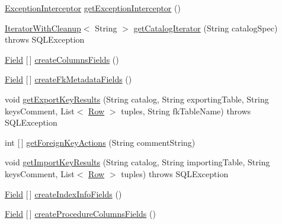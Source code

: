 \begin{DoxyCompactItemize}
\item 
\mbox{\hyperlink{interfacecom_1_1mysql_1_1cj_1_1exceptions_1_1_exception_interceptor}{Exception\+Interceptor}} \mbox{\hyperlink{classcom_1_1mysql_1_1cj_1_1jdbc_1_1_database_meta_data_a099b29ac36f3fc4040a843f2e1ca5b46}{get\+Exception\+Interceptor}} ()
\item 
\mbox{\hyperlink{classcom_1_1mysql_1_1cj_1_1jdbc_1_1_database_meta_data_1_1_iterator_with_cleanup}{Iterator\+With\+Cleanup}}$<$ String $>$ \mbox{\hyperlink{classcom_1_1mysql_1_1cj_1_1jdbc_1_1_database_meta_data_a709197b5fd5dbba7b90c0f12ee9f86b8}{get\+Catalog\+Iterator}} (String catalog\+Spec)  throws S\+Q\+L\+Exception 
\item 
\mbox{\hyperlink{classcom_1_1mysql_1_1cj_1_1result_1_1_field}{Field}} \mbox{[}$\,$\mbox{]} \mbox{\hyperlink{classcom_1_1mysql_1_1cj_1_1jdbc_1_1_database_meta_data_af031b115633d183b943a5fa3ffd6641c}{create\+Columns\+Fields}} ()
\item 
\mbox{\hyperlink{classcom_1_1mysql_1_1cj_1_1result_1_1_field}{Field}} \mbox{[}$\,$\mbox{]} \mbox{\hyperlink{classcom_1_1mysql_1_1cj_1_1jdbc_1_1_database_meta_data_a6c3372eaf2f4bec096f6fb59701b55a0}{create\+Fk\+Metadata\+Fields}} ()
\item 
void \mbox{\hyperlink{classcom_1_1mysql_1_1cj_1_1jdbc_1_1_database_meta_data_a89f8cded7b6c04309018a414b3698a97}{get\+Export\+Key\+Results}} (String catalog, String exporting\+Table, String keys\+Comment, List$<$ \mbox{\hyperlink{interfacecom_1_1mysql_1_1cj_1_1result_1_1_row}{Row}} $>$ tuples, String fk\+Table\+Name)  throws S\+Q\+L\+Exception 
\item 
int \mbox{[}$\,$\mbox{]} \mbox{\hyperlink{classcom_1_1mysql_1_1cj_1_1jdbc_1_1_database_meta_data_a0becadcb3e84a1149a496560177d0170}{get\+Foreign\+Key\+Actions}} (String comment\+String)
\item 
void \mbox{\hyperlink{classcom_1_1mysql_1_1cj_1_1jdbc_1_1_database_meta_data_ad10a46147a3e514a235c7069c68bc0c1}{get\+Import\+Key\+Results}} (String catalog, String importing\+Table, String keys\+Comment, List$<$ \mbox{\hyperlink{interfacecom_1_1mysql_1_1cj_1_1result_1_1_row}{Row}} $>$ tuples)  throws S\+Q\+L\+Exception 
\item 
\mbox{\hyperlink{classcom_1_1mysql_1_1cj_1_1result_1_1_field}{Field}} \mbox{[}$\,$\mbox{]} \mbox{\hyperlink{classcom_1_1mysql_1_1cj_1_1jdbc_1_1_database_meta_data_a1bac977fae79104ef21d90a3d1d9613a}{create\+Index\+Info\+Fields}} ()
\item 
\mbox{\hyperlink{classcom_1_1mysql_1_1cj_1_1result_1_1_field}{Field}} \mbox{[}$\,$\mbox{]} \mbox{\hyperlink{classcom_1_1mysql_1_1cj_1_1jdbc_1_1_database_meta_data_a3d9ed6638e8ae9061fcb2d3aaae74613}{create\+Procedure\+Columns\+Fields}} ()

\end{DoxyCompactItemize}
